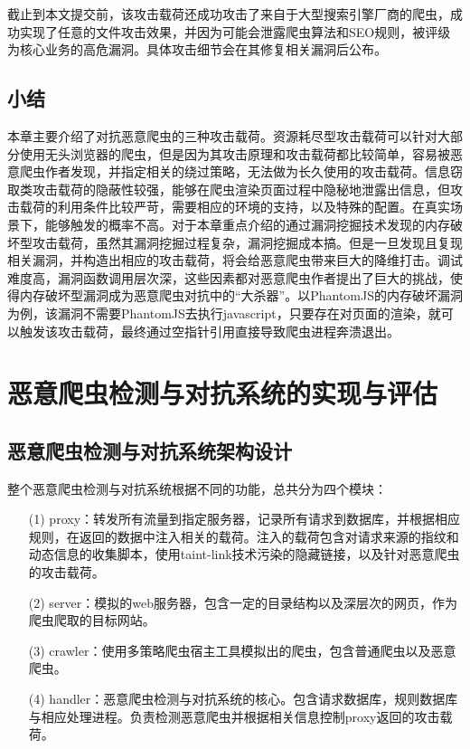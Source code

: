 \documentclass[doctor,privacy,twoside]{buaa_mac}
\begin{document}
截止到本文提交前，该攻击载荷还成功攻击了来自于大型搜索引擎厂商的爬虫，成功实现了任意的文件攻击效果，并因为可能会泄露爬虫算法和SEO规则，被评级为核心业务的高危漏洞。具体攻击细节会在其修复相关漏洞后公布。

\section{小结}
本章主要介绍了对抗恶意爬虫的三种攻击载荷。资源耗尽型攻击载荷可以针对大部分使用无头浏览器的爬虫，但是因为其攻击原理和攻击载荷都比较简单，容易被恶意爬虫作者发现，并指定相关的绕过策略，无法做为长久使用的攻击载荷。信息窃取类攻击载荷的隐蔽性较强，能够在爬虫渲染页面过程中隐秘地泄露出信息，但攻击载荷的利用条件比较严苛，需要相应的环境的支持，以及特殊的配置。在真实场景下，能够触发的概率不高。对于本章重点介绍的通过漏洞挖掘技术发现的内存破坏型攻击载荷，虽然其漏洞挖掘过程复杂，漏洞挖掘成本搞。但是一旦发现且复现相关漏洞，并构造出相应的攻击载荷，将会给恶意爬虫带来巨大的降维打击。调试难度高，漏洞函数调用层次深，这些因素都对恶意爬虫作者提出了巨大的挑战，使得内存破坏型漏洞成为恶意爬虫对抗中的“大杀器”。以PhantomJS的内存破坏漏洞为例，该漏洞不需要PhantomJS去执行javascript，只要存在对页面的渲染，就可以触发该攻击载荷，最终通过空指针引用直接导致爬虫进程奔溃退出。


\chapter{恶意爬虫检测与对抗系统的实现与评估}



\section{恶意爬虫检测与对抗系统架构设计}

整个恶意爬虫检测与对抗系统根据不同的功能，总共分为四个模块：

\begin{itemize}
\item[(1)] proxy：转发所有流量到指定服务器，记录所有请求到数据库，并根据相应规则，在返回的数据中注入相关的载荷。注入的载荷包含对请求来源的指纹和动态信息的收集脚本，使用taint-link技术污染的隐藏链接，以及针对恶意爬虫的攻击载荷。
\item[(2)] server：模拟的web服务器，包含一定的目录结构以及深层次的网页，作为爬虫爬取的目标网站。
\item[(3)] crawler：使用多策略爬虫宿主工具模拟出的爬虫，包含普通爬虫以及恶意爬虫。
\item[(4)] handler：恶意爬虫检测与对抗系统的核心。包含请求数据库，规则数据库与相应处理进程。负责检测恶意爬虫并根据相关信息控制proxy返回的攻击载荷。
\end{itemize}
\end{document}
